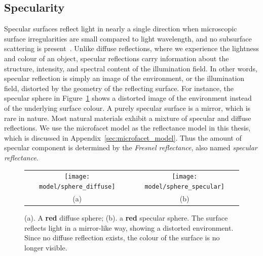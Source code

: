 \subsection{Specularity}
Specular surfaces reflect light in nearly a single direction when microscopic surface irregularities are small compared to light wavelength, and no subsurface scattering is present~\cite{nayar1989surface}. Unlike diffuse reflections, where we experience the lightness and colour of an object, specular reflections carry information about the structure, intensity, and spectral content of the illumination field. In other words, specular reflection is simply an image of the environment, or the illumination field, distorted by the geometry of the reflecting surface. For instance, the specular sphere in Figure~\ref{fig:spec_ref} shows a distorted image of the environment instead of the underlying surface colour. A purely specular surface is a mirror, which is rare in nature. Most natural materials exhibit a mixture of specular and diffuse reflections. We use the microfacet model as the reflectance model in this thesis, which is discussed in Appendix~\ref{sec:microfacet_model}. Thus the amount of specular component is determined by the \textit{Fresnel reflectance}, also named \textit{specular reflectance}.
\begin{figure}[!htbp]
\centering
\begin{tabular}{cc}
\texttt{[image: model/sphere\_diffuse]}&
\texttt{[image: model/sphere\_specular]}\\
(a) & (b)\\
\end{tabular}
\caption{(a). A \textbf{red} diffuse sphere; (b). a \textbf{red} specular sphere. The surface reflects light in a mirror-like way, showing a distorted environment. Since no diffuse reflection exists, the colour of the surface is no longer visible.}
\label{fig:spec_ref}
\end{figure}

